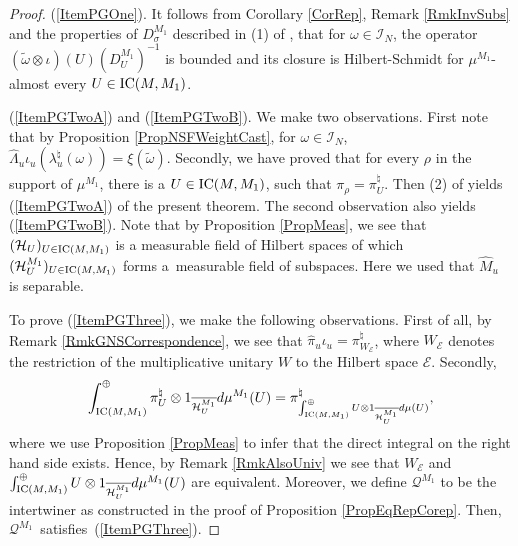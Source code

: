 \documentclass[11pt]{article}
\numberwithin{equation}{section}
\theoremstyle{definition}
\newcommand{\cHil}{\mathcal{H}}
\newcommand{\ICMM}{\text{\rm IC}(M, M_1)}
\begin{document}
\begin{proof}
(\ref{ItemPGOne}). It follows from  Corollary \ref{CorRep}, Remark \ref{RmkInvSubs} and the properties of $D_\sigma^{M_1}$ described in (1) of \cite[Theorem 3.4.5]{Des}, that for $\omega \in \mathcal{I}_N$, the operator $(\tilde{\omega} \otimes \iota)(U) (D_U^{M_1})^{-1}$ is bounded and its closure is Hilbert-Schmidt for $\mu^{M_1}$-almost every $U \in \ICMM$.

(\ref{ItemPGTwoA}) and (\ref{ItemPGTwoB}). We make two observations. First note that by  Proposition \ref{PropNSFWeightCast}, for $\omega \in \mathcal{I}_N$,
$
\hat{\Lambda}_u \iota_u( \lambda_u^\natural(\omega))  = \xi(\tilde{\omega}).
$
Secondly, we have proved that for every $\rho$ in the support of $\mu^{M_1}$, there is a $U \in \ICMM$, such that $\pi_\rho = \pi_U^\natural$. Then (2) of \cite[Theorem 3.4.5]{Des} yields (\ref{ItemPGTwoA}) of the present theorem. The second observation also yields (\ref{ItemPGTwoB}). Note that by Proposition \ref{PropMeas}, we see that $(\cHil_U)_{U \in \ICMM}$ is a measurable f\/ield of Hilbert spaces of which $(\cHil_U^{M_1})_{U \in \ICMM}$ forms a~measurable f\/ield of subspaces. Here we used that $\hat{M}_u$ is separable.


To prove (\ref{ItemPGThree}), we make the following observations. First of all, by Remark \ref{RmkGNSCorrespondence}, we see that $\hat{\pi}_u \iota_u = \pi_{W_{\mathcal{E}}}^\natural$, where $W_{\mathcal{E}}$ denotes the restriction of the multiplicative unitary $W$ to the Hilbert space $\mathcal{E}$. Secondly,
\[
\int_{\ICMM}^\oplus  \pi_U^\natural \otimes 1_{ \overline{ \cHil_U^{M_1}}} d\mu^{M_1}(U) =
\pi_{\int^\oplus_{\ICMM} U \otimes 1_{\overline{\cHil_U^{M_1}}} d\mu(U)}^\natural,
\]
where we use Proposition \ref{PropMeas} to infer that the direct integral on the right hand side exists.
Hence, by Remark \ref{RmkAlsoUniv} we see that $W_\mathcal{E}$ and $\int^\oplus_{\ICMM} U \otimes 1_{\overline{\cHil_U^{M_1}}} d\mu^{M_1}(U)$ are equivalent. Moreover, we def\/ine $\mathcal{Q}^{M_1}$ to be the intertwiner as constructed in the proof of Proposition \ref{PropEqRepCorep}. Then, $\mathcal{Q}^{M_1}$~satisf\/ies~(\ref{ItemPGThree}).
\end{proof}
\end{document}
